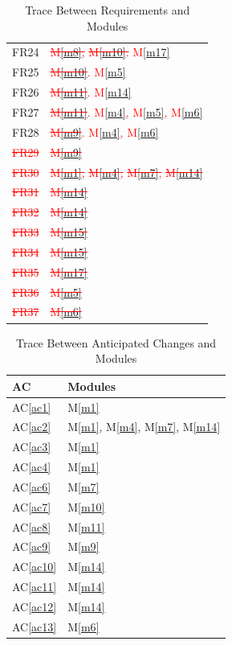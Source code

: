 \documentclass[12pt, titlepage]{article}
\newcommand{\acref}[1]{AC\ref{#1}}
\newcommand{\mref}[1]{M\ref{#1}}
\begin{document}
\begin{table}[H]
\begin{tabular}{p{} p{}}
		FR24 & \textcolor{red}{\sout{\mref{m8},}} \textcolor{red}{\sout{\mref{m10}.}} \textcolor{red}{\mref{m17}}\\
		FR25 & \textcolor{red}{\sout{\mref{m10}}}\textcolor{red}{. \mref{m5}}\\
		FR26 & \textcolor{red}{\sout{\mref{m11}}}\textcolor{red}{. \mref{m14}}\\
		FR27 & \textcolor{red}{\sout{\mref{m11}}}\textcolor{red}{. \mref{m4}, \mref{m5}, \mref{m6}}\\
		FR28 & \textcolor{red}{\sout{\mref{m9}}}\textcolor{red}{. \mref{m4}, \mref{m6}}\\
		\textcolor{red}{\sout{FR29}} & \textcolor{red}{\sout{\mref{m9}}}\\
		\textcolor{red}{\sout{FR30}} & \textcolor{red}{\sout{\mref{m1},}} \textcolor{red}{\sout{\mref{m4},}} \textcolor{red}{\sout{\mref{m7},}} \textcolor{red}{\sout{\mref{m14}}}\\
		\textcolor{red}{\sout{FR31}} & \textcolor{red}{\sout{\mref{m14}}}\\
		\textcolor{red}{\sout{FR32}} & \textcolor{red}{\sout{\mref{m14}}}\\
		\textcolor{red}{\sout{FR33}} & \textcolor{red}{\sout{\mref{m15}}}\\
		\textcolor{red}{\sout{FR34}} & \textcolor{red}{\sout{\mref{m15}}}\\
		\textcolor{red}{\sout{FR35}} & \textcolor{red}{\sout{\mref{m17}}}\\
		\textcolor{red}{\sout{FR36}} & \textcolor{red}{\sout{\mref{m5}}}\\
		\textcolor{red}{\sout{FR37}} & \textcolor{red}{\sout{\mref{m6}}}\\
		\bottomrule
	\end{tabular}
	\caption{Trace Between Requirements and Modules}
	\label{TblRT}
\end{table}

\begin{table}[H]
	\centering
	\begin{tabular}{p{} p{}}
		\toprule
		\textbf{AC} & \textbf{Modules}\\
		\midrule
		\acref{ac1} & \mref{m1}\\
		\acref{ac2} & \mref{m1}, \mref{m4}, \mref{m7}, \mref{m14}\\
		\acref{ac3} & \mref{m1}\\
		\acref{ac4} & \mref{m1}\\
		\acref{ac6} & \mref{m7}\\
		\acref{ac7} & \mref{m10}\\
		\acref{ac8} & \mref{m11}\\
		\acref{ac9} & \mref{m9}\\
		\acref{ac10} & \mref{m14}\\
		\acref{ac11} & \mref{m14}\\
		\acref{ac12} & \mref{m14}\\
		\acref{ac13} & \mref{m6}\\
		\bottomrule
	\end{tabular}
	\caption{Trace Between Anticipated Changes and Modules}
	\label{TblACT}
\end{table}
\end{document}
